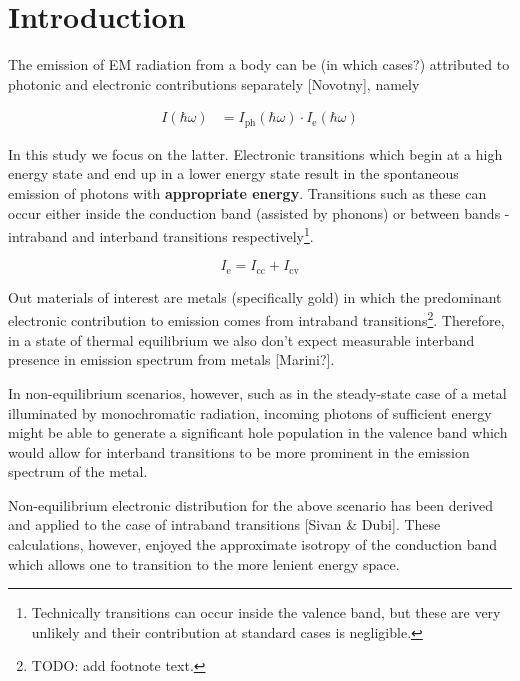 \newpage
\section{Introduction}
\label{sec:introduction}

The emission of EM radiation from a body can be (in which cases?) attributed to photonic and electronic contributions separately [Novotny], namely

\begin{align}
I(\hbar\omega) &= I_{\text{ph}}(\hbar\omega)\cdot I_{\text{e}}(\hbar\omega)
\label{eq:intro_emission_split}
\end{align}

In this study we focus on the latter. Electronic transitions which begin at a high energy state and end up in a lower energy state result in the spontaneous emission of photons with \textbf{appropriate energy}. Transitions such as these can occur either inside the conduction band (assisted by phonons) or between bands - intraband and interband transitions respectively\footnote{Technically transitions can occur inside the valence band, but these are very unlikely and their contribution at standard cases is negligible.}.

\begin{equation}
I_{\text{e}} = I_{\text{cc}} + I_{\text{cv}}
\label{eq:intro_emission_components}
\end{equation}

Out materials of interest are metals (specifically gold) in which the predominant electronic contribution to emission comes from intraband transitions\footnote{TODO: add footnote text.}. Therefore, in a state of thermal equilibrium we also don't expect measurable interband presence in emission spectrum from metals [Marini?].

\begin{tcolorbox}[title={Note: Main Thesis}]
In non-equilibrium scenarios, however, such as in the steady-state case of a metal illuminated by monochromatic radiation, incoming photons of sufficient energy might be able to generate a significant hole population in the valence band which would allow for interband transitions to be more prominent in the emission spectrum of the metal.
\end{tcolorbox}

Non-equilibrium electronic distribution for the above scenario has been derived and applied to the case of intraband transitions [Sivan \& Dubi]. These calculations, however, enjoyed the approximate isotropy of the conduction band which allows one to transition to the more lenient energy space.

